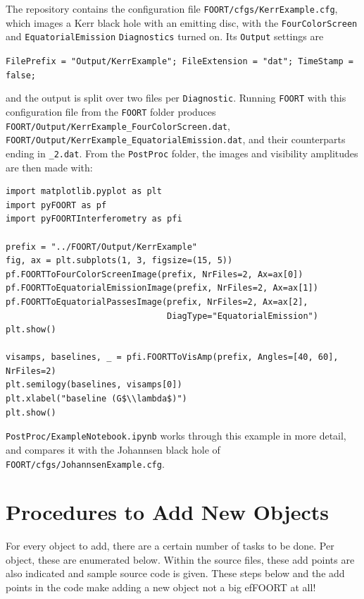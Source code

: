 \documentclass[11pt,a4paper]{article}
\newcommand{\code}[1]{{\tt #1}}
\begin{document}
The repository contains the configuration file \code{FOORT/cfgs/KerrExample.cfg}, which images a Kerr black hole with an emitting disc, with the \code{FourColorScreen} and \code{EquatorialEmission} \code{Diagnostics} turned on. Its \code{Output} settings are
\begin{center}
\code{FilePrefix = "Output/KerrExample"; FileExtension = "dat"; TimeStamp = false;}
\end{center}
and the output is split over two files per \code{Diagnostic}. Running \code{FOORT} with this configuration file from the \code{FOORT} folder produces \code{FOORT/Output/KerrExample\_FourColorScreen.dat}, \code{FOORT/Output/KerrExample\_EquatorialEmission.dat}, and their counterparts ending in \code{\_2.dat}. From the \code{PostProc} folder, the images and visibility amplitudes are then made with:
\begin{verbatim}
import matplotlib.pyplot as plt
import pyFOORT as pf
import pyFOORTInterferometry as pfi

prefix = "../FOORT/Output/KerrExample"
fig, ax = plt.subplots(1, 3, figsize=(15, 5))
pf.FOORTToFourColorScreenImage(prefix, NrFiles=2, Ax=ax[0])
pf.FOORTToEquatorialEmissionImage(prefix, NrFiles=2, Ax=ax[1])
pf.FOORTToEquatorialPassesImage(prefix, NrFiles=2, Ax=ax[2],
                                DiagType="EquatorialEmission")
plt.show()

visamps, baselines, _ = pfi.FOORTToVisAmp(prefix, Angles=[40, 60], NrFiles=2)
plt.semilogy(baselines, visamps[0])
plt.xlabel("baseline (G$\\lambda$)")
plt.show()
\end{verbatim}
\code{PostProc/ExampleNotebook.ipynb} works through this example in more detail, and compares it with the Johannsen black hole of \code{FOORT/cfgs/JohannsenExample.cfg}.








\section{Procedures to Add New Objects}
For every object to add, there are a certain number of tasks to be done. Per object, these are enumerated below. Within the source files, these add points are also indicated and sample source code is given. These steps below and the add points in the code make adding a new object not a big efFOORT at all!
\end{document}
